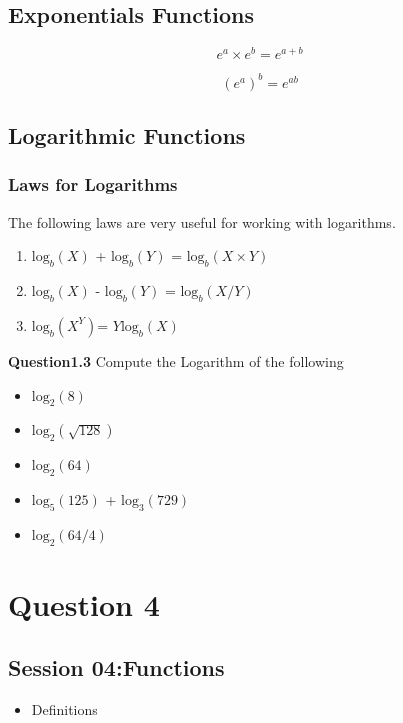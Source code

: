 \documentclass[]{report}
\begin{document}
\subsection{Exponentials Functions}

\[ e^a \times e^b = e^{a+b}\]

\[ (e^a )^b = e^{ab}\]
\subsection{Logarithmic Functions}

\subsubsection{Laws for Logarithms}
The following laws are very useful for working with logarithms.
\begin{enumerate}
	\item $\mbox{log}_b(X)$ + $\mbox{log}_b(Y)$ = $\mbox{log}_b(X\times Y)$
	\item $\mbox{log}_b(X)$ - $\mbox{log}_b(Y)$ = $\mbox{log}_b(X / Y)$
	\item $\mbox{log}_b(X^Y)$= $Y \mbox{log}_b(X)$
\end{enumerate}

\noindent \textbf{Question1.3} Compute the Logarithm of the following
\begin{itemize}
	\item $\mbox{log}_2(8)$
	\item $\mbox{log}_2(\sqrt{128})$
	\item $\mbox{log}_2(64)$
	\item $\mbox{log}_5(125)$ +   $\mbox{log}_3(729)$
	\item $\mbox{log}_2(64/4)$
\end{itemize}
\section*{Question 4}



\subsection*{Session 04:Functions}
\begin{itemize}
	\item Definitions
\end{itemize}
\end{document}
